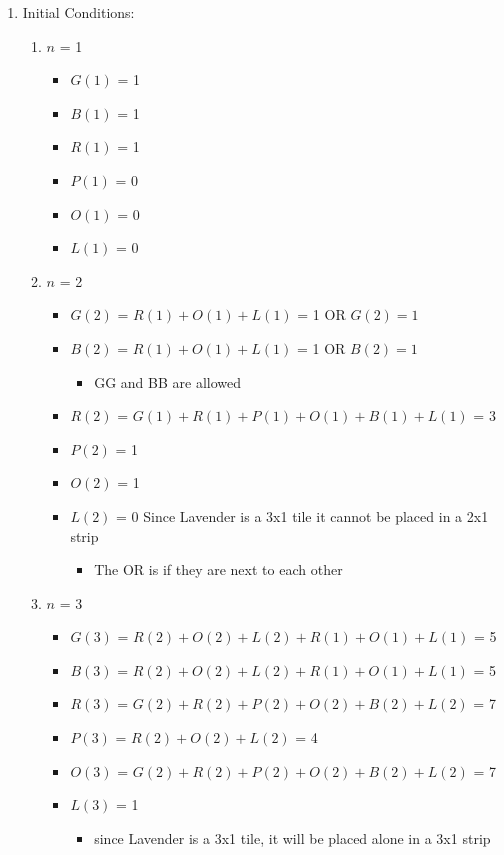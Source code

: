 \documentclass[11pt]{article}
\newcounter{prnum}
\newenvironment{problem}{{\vskip 0.2in\noindent\bf Problem
       \addtocounter{prnum}{1} \arabic{prnum}.}}{\vskip 0.1in}
\begin{document}
\begin{problem}
\begin{enumerate}
  \item Initial Conditions:
    \begin{enumerate}
      \item $n$ = 1
    \begin{itemize}
      \item $G(1)$ = 1
      \item $B(1)$ = 1
      \item $R(1)$ = 1
      \item $P(1)$ = 0
      \item $O(1)$ = 0
      \item $L(1)$ = 0
    \end{itemize}
  \item $n$ = 2 
    \begin{itemize}
      \item $G(2)$ = $R(1) + O(1) + L(1)$ = 1 OR $G(2) = 1$
      \item $B(2)$ = $R(1) + O(1) + L(1)$ = 1 OR $B(2) = 1$
        \begin{itemize}
          \item GG and BB are allowed
        \end{itemize}
      \item $R(2)$ = $G(1) + R(1) + P(1) + O(1) + B(1) + L(1)$ = 3
      \item $P(2)$ = 1
      \item $O(2)$ = 1
      \item $L(2)$ = 0 \Rightarrow\space Since Lavender is a 3x1 tile it cannot be placed in a 2x1 strip
        \begin{itemize}
          \item The OR is if they are next to each other
        \end{itemize}
        \end{itemize}
      \item $n$ = 3
        \begin{itemize}
          \item $G(3)$ = $R(2) + O(2) + L(2) + R(1) + O(1) + L(1)$ = 5
          \item $B(3)$ = $R(2) + O(2) + L(2) + R(1) + O(1) + L(1)$ = 5
          \item $R(3)$ = $G(2) + R(2) + P(2) + O(2) + B(2) + L(2)$ = 7
          \item $P(3)$ = $R(2) + O(2) + L(2)$ = 4
          \item $O(3)$ = $G(2) + R(2) + P(2) + O(2) + B(2) + L(2)$ = 7
          \item $L(3)$ = 1
            \begin{itemize}
              \item since Lavender is a 3x1 tile, it will be placed alone in a 3x1 strip
            \end{itemize}
    \end{itemize}
      
    \end{enumerate}
\end{enumerate}

\end{problem}
  
\end{document}
